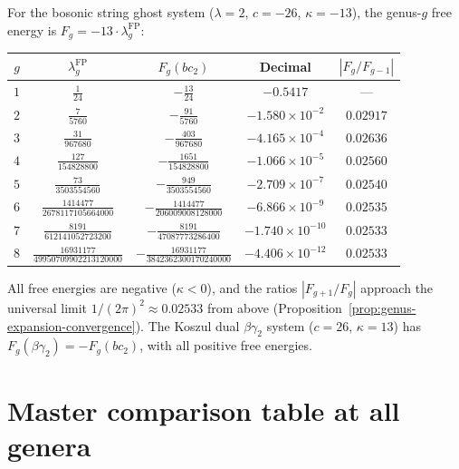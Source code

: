 \begin{computation}
\label{comp:bc-ghost-genus}
For the bosonic string ghost system ($\lambda = 2$,
$c = -26$, $\kappa = -13$), the genus-$g$ free energy
is $F_g = -13 \cdot \lambda_g^{\mathrm{FP}}$:

\medskip
\begin{center}
\renewcommand{\arraystretch}{1.3}
\begin{tabular}{ccccc}
\toprule
$g$ & $\lambda_g^{\mathrm{FP}}$ & $F_g(bc_2)$ & Decimal & $|F_g/F_{g-1}|$ \\
\midrule
$1$ & $\frac{1}{24}$ & $-\frac{13}{24}$ & $-0.5417$ & --- \\[6pt]
$2$ & $\frac{7}{5760}$ & $-\frac{91}{5760}$ & $-1.580 \times 10^{-2}$ & $0.02917$ \\[6pt]
$3$ & $\frac{31}{967680}$ & $-\frac{403}{967680}$ & $-4.165 \times 10^{-4}$ & $0.02636$ \\[6pt]
$4$ & $\frac{127}{154828800}$ & $-\frac{1651}{154828800}$ & $-1.066 \times 10^{-5}$ & $0.02560$ \\[6pt]
$5$ & $\frac{73}{3503554560}$ & $-\frac{949}{3503554560}$ & $-2.709 \times 10^{-7}$ & $0.02540$ \\[6pt]
$6$ & $\frac{1414477}{2678117105664000}$ & $-\frac{1414477}{206009008128000}$ & $-6.866 \times 10^{-9}$ & $0.02535$ \\[6pt]
$7$ & $\frac{8191}{612141052723200}$ & $-\frac{8191}{47087773286400}$ & $-1.740 \times 10^{-10}$ & $0.02533$ \\[6pt]
$8$ & $\frac{16931177}{49950709902213120000}$ & $-\frac{16931177}{3842362300170240000}$ & $-4.406 \times 10^{-12}$ & $0.02533$ \\[4pt]
\bottomrule
\end{tabular}
\end{center}

\medskip
\noindent
All free energies are negative ($\kappa < 0$), and the ratios
$|F_{g+1}/F_g|$ approach the universal limit
$1/(2\pi)^2 \approx 0.02533$ from above
(Proposition~\ref{prop:genus-expansion-convergence}).
The Koszul dual $\beta\gamma_2$ system ($c = 26$, $\kappa = 13$)
has $F_g(\beta\gamma_2) = -F_g(bc_2)$, with all positive
free energies.
\end{computation}


\section{Master comparison table at all genera}
\label{sec:master-genus-comparison}

